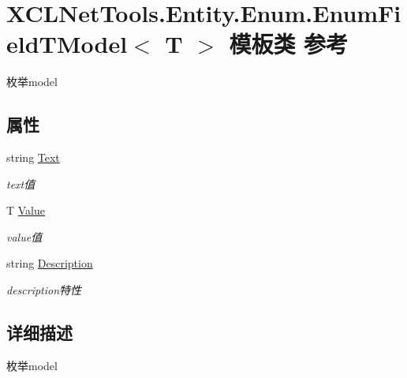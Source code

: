 \hypertarget{class_x_c_l_net_tools_1_1_entity_1_1_enum_1_1_enum_field_t_model_3_01_t_01_4}{\section{X\-C\-L\-Net\-Tools.\-Entity.\-Enum.\-Enum\-Field\-T\-Model$<$ T $>$ 模板类 参考}
\label{class_x_c_l_net_tools_1_1_entity_1_1_enum_1_1_enum_field_t_model_3_01_t_01_4}
}


枚举model  


\subsection*{属性}
\begin{DoxyCompactItemize}
\item 
string \hyperlink{class_x_c_l_net_tools_1_1_entity_1_1_enum_1_1_enum_field_t_model_3_01_t_01_4_a19570f5fcd9bb314ca1e7e8f3b8f44b1}{Text}
\begin{DoxyCompactList}\small\item\em text值 \end{DoxyCompactList}\item 
T \hyperlink{class_x_c_l_net_tools_1_1_entity_1_1_enum_1_1_enum_field_t_model_3_01_t_01_4_a0b6e9efa5eb3b809fdc2bbb675a4e8e3}{Value}
\begin{DoxyCompactList}\small\item\em value值 \end{DoxyCompactList}\item 
string \hyperlink{class_x_c_l_net_tools_1_1_entity_1_1_enum_1_1_enum_field_t_model_3_01_t_01_4_a6702736fc7d4f0f7cfefb74722f9c2ba}{Description}
\begin{DoxyCompactList}\small\item\em description特性 \end{DoxyCompactList}\end{DoxyCompactItemize}


\subsection{详细描述}
枚举model 


